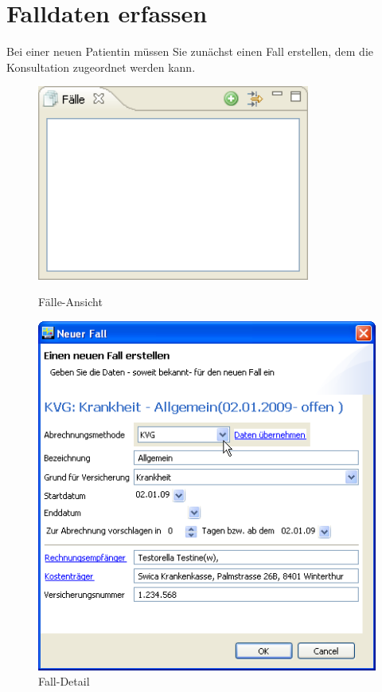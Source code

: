 \section{Falldaten erfassen}
Bei einer neuen Patientin müssen Sie zunächst einen \glqq Fall\grqq{} erstellen, dem
die Konsultation zugeordnet werden kann.

\begin{figure}[htbp]
     \begin{minipage}{0.4\textwidth}
      \centering
       \includegraphics[width=0.8\textwidth]{images/einf3}
       \caption{Fälle-Ansicht}
       	\label{fig:faelle1}
     \end{minipage}\hfill
     \begin{minipage}{0.6\textwidth}
      \centering
       \includegraphics[width=1.0\textwidth]{images/einf4}
       \caption{Fall-Detail}
       \label{fig:falldetail}
     \end{minipage}
   \end{figure}


